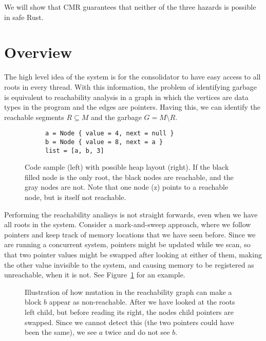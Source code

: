 We will show that CMR guarantees that neither of the three hazards is possible in safe Rust.

\section{Overview\label{sec:cmr-overview}}

The high level idea of the system is for the consolidator to have easy access to all roots in every
thread. With this information, the problem of identifying garbage is equivalent to reachability
analysis in a graph in which the vertices are data types in the program and the edges are pointers.
 Having this, we can
identify the reachable segments $R \subseteq M$ and the garbage $G = M \setminus R$.

\begin{figure}[ht]
  \centering
  \begin{subfigure}{0.45\textwidth}
    \begin{lstlisting}
a = Node { value = 4, next = null }
b = Node { value = 8, next = a }
list = [a, b, 3]
    \end{lstlisting}
  \end{subfigure}
  \hfill
  \begin{subfigure}{0.45\textwidth}
    
  \end{subfigure}
  \caption{Code sample (left) with possible heap layout (right). If the black filled node is the
  only root, the black nodes are reachable, and the gray nodes are not. Note that one node (z)
  points to a reachable node, but is itself not reachable.}
\end{figure}

Performing the reachability analisys is not straight forwards, even when we have all roots in the
system. Consider a mark-and-sweep approach, where we follow pointers and keep track of memory
locations that we have seen before. Since we are running a concurrent system, pointers might be
updated while we scan, so that two pointer values might be swapped after looking at either of them,
making the other value invisible to the system, and causing memory to be registered as unreachable,
when it is not. See Figure~\ref{fig:pointer-swap} for an example.

\begin{figure}[ht]
  \centering
  
  \caption{Illustration of how mutation in the reachability graph can make a block $b$ appear as
  non-reachable. After we have looked at the roots left child, but before reading its right, the
  nodes child pointers are swapped. Since we cannot detect this (the two pointers could have been
  the same), we see $a$ twice and do not see $b$.\label{fig:pointer-swap}}
\end{figure}

